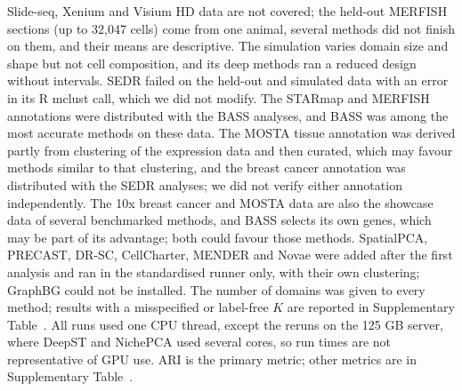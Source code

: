 \documentclass[unnumsec,webpdf,contemporary,large]{oup-authoring-template}
\begin{document}
Slide-seq, Xenium and Visium HD data are not covered; the held-out MERFISH sections (up to 32,047 cells) come from one animal, several
methods did not finish on them, and their means are descriptive. The simulation varies domain size and shape but not cell composition, and its
deep methods ran a reduced design without intervals. SEDR failed on the held-out and simulated data with an error in its R mclust call, which we
did not modify.
The STARmap and MERFISH annotations were distributed with the BASS analyses, and BASS was among the most accurate methods on these
data. The MOSTA tissue annotation was derived partly from clustering of the expression data and then curated, which may favour
methods similar to that clustering, and the breast cancer annotation was distributed with the SEDR analyses; we did not verify
either annotation independently. The 10x breast cancer and MOSTA data are also the showcase data of several benchmarked methods, and BASS selects its own genes, which may be part of its advantage; both could favour those methods. SpatialPCA, PRECAST, DR-SC, CellCharter, MENDER and Novae were added after the first analysis and ran in the standardised runner only,
with their own clustering; GraphBG could not be installed. The number of domains was given to every method; results with a misspecified or label-free $K$ are reported in Supplementary Table~\STk. All runs used one CPU thread, except the reruns on the 125 GB server, where DeepST and NichePCA used several cores, so run times are not
representative of GPU use. ARI is the primary metric; other metrics are in Supplementary Table~\STmetrics.
\end{document}
